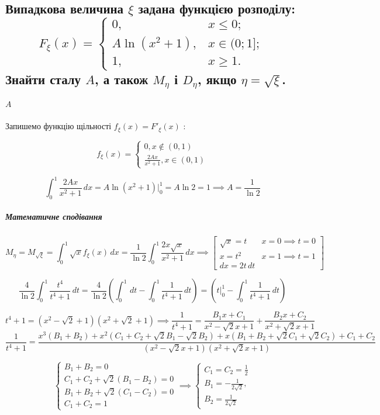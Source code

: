 \documentclass[a4paper, 12pt, oneside]{extarticle}
\newcommand{\Problem}{\subsection}
\begin{document}
\Problem{
	Випадкова величина $\xi$ задана функцією розподілу:
	$$
		F_{\xi}(x)=
		\begin{cases}
			0, & x \leq 0; \\
			A\ln(x^2+1), & x \in (0; 1]; \\
			1, & x \geq 1.
		\end{cases}
	$$
	Знайти сталу $A$, а також $M_{\eta}$ і $D_{\eta}$, якщо $\eta=\sqrt{\xi}$.
}

\subparagraph{$A$}

Запишемо функцію щільності
	$f_\xi(x) = F'_\xi(x)$
:

\[
	f_\xi(x) =
	\begin{cases}
		0, x \notin (0,1) \\
		\frac{2Ax}{x^2+1}, x \in (0,1)
	\end{cases}
\]

\[
	\int_0^1 \frac{2Ax}{x^2+1} \,dx
	= A\ln(x^2+1) \Big|_0^1
	= A\ln 2 = 1 \implies
	A = \frac{1}{\ln 2}
\]

\subparagraph{Математичне сподівання}

\[
	M_\eta = M_{\sqrt{\xi}} = \int_0^1 \sqrt{x} f_\xi(x)\, dx
	= \frac{1}{\ln 2} \int_0^1 \frac{2x\sqrt{x}}{x^2+1} \, dx
	\implies
	\left[
	\begin{array}{lc}
		\sqrt{x} = t & x = 0 \implies t = 0 \\
		x = t^2 & x = 1 \implies t = 1 \\
		dx = 2t\,dt
	\end{array}
	\right]
\]

\[
	\frac{4}{\ln2} \int_0^1 \frac{t^4}{t^4+1} \, dt
	=
	\frac{4}{\ln2}
	\left(
		\int_0^1 \,dt -\int_0^1\frac{1}{t^4+1} \, dt
	\right)
	=
	\left(
		t \Big|_0^1 -\int_0^1\frac{1}{t^4+1} \, dt
	\right)
\]

\[
	t^4+1 = (x^2-\sqrt{2}+1)(x^2+\sqrt{2}+1) \implies
	\frac{1}{t^4+1} = \frac{B_1x+C_1}{x^2-\sqrt{2}x+1} + \frac{B_2x+C_2}{x^2+\sqrt{2}x+1}
\]
\[
	\frac{1}{t^4+1} = \frac{x^3(B_1+B_2)+x^2(C_1+C_2+\sqrt{2}B_1-\sqrt2B_2) + x(B_1+B_2+\sqrt{2}C_1+\sqrt{2}C_2)+C_1+C_2}
	{(x^2-\sqrt{2}x+1)(x^2+\sqrt{2}x+1)}
\]

\[
	\begin{cases}
		B_1+B_2=0 \\
		C_1+C_2+\sqrt{2}(B_1-B_2)=0 \\
		B_1+B_2+\sqrt{2}(C_1-C_2)=0 \\
		C_1+C_2=1
	\end{cases}
	\implies
	\begin{cases}
		C_1=C_2=\frac{1}{2} \\
		B_1=-\frac{1}{2\sqrt2}, \\
		B_2=\frac{1}{2\sqrt2}
	\end{cases}
\]
\end{document}
